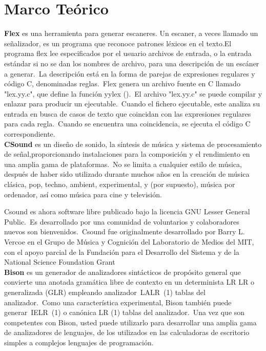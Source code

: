 \documentclass[12pt]{article}
\begin{document}
\section{Marco Teórico}

{\bf Flex} es una herramienta para generar escaneres. Un escaner, a veces llamado un señalizador, es un programa que reconoce patrones léxicos en el texto.El programa flex lee especificados por el usuario archivos de entrada, o la entrada estándar si no se dan los nombres de archivo, para una descripción de un escáner a generar. La descripción está en la forma de parejas de expresiones regulares y código C, denominadas reglas. Flex genera un archivo fuente en C llamado "lex.yy.c", que define la función yylex (). El archivo "lex.yy.c" se puede compilar y enlazar para producir un ejecutable. Cuando el fichero ejecutable, este analiza su entrada en busca de casos de texto que coincidan con las expresiones regulares para cada regla. Cuando se encuentra una coincidencia, se ejecuta el código C correspondiente. \\


{\bf CSound} es un diseño de sonido, la síntesis de música y sistema de procesamiento de señal,proporcionando instalaciones para la composición y el rendimiento en una amplia gama de plataformas. No se limita a cualquier estilo de música, después de haber sido utilizado durante muchos años en la creación de música clásica, pop, techno, ambient, experimental, y (por supuesto), música por ordenador, así como música para cine y televisión.

Csound es ahora software libre publicado bajo la licencia GNU Lesser General Public. Es desarrollado por una comunidad de voluntarios y colaboradores nuevos son bienvenidos. Csound fue originalmente desarrollado por Barry L. Vercoe en el Grupo de Música y Cognición del Laboratorio de Medios del MIT, con el apoyo parcial de la Fundación para el Desarrollo del Sistema y de la National Science Foundation Grant\\

{\bf Bison} es un generador de analizadores sintácticos de propósito general que convierte una anotada gramática libre de contexto en un determinista LR LR o generalizada (GLR) empleando analizador LALR (1) tablas del analizador. Como una característica experimental, Bison también puede generar IELR (1) o canónica LR (1) tablas del analizador. Una vez que son competentes con Bison, usted puede utilizarlo para desarrollar una amplia gama de analizadores de lenguajes, de los utilizados en las calculadoras de escritorio simples a complejos lenguajes de programación.\\
\end{document}
